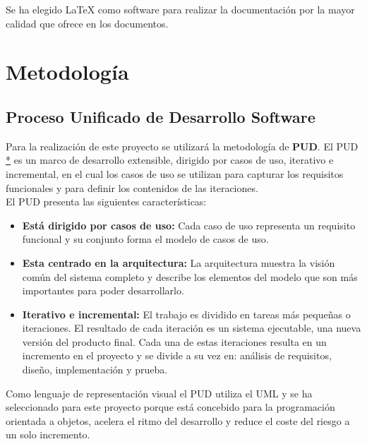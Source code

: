 \documentclass[12pt, a4paper]{book}
\begin{document}
Se ha elegido LaTeX como software para realizar la documentación por la mayor calidad que ofrece en los documentos. \\

\newpage



\chapter{Metodología}

\section{Proceso Unificado de Desarrollo Software}
Para la realización de este proyecto se utilizará la metodología de \textbf{ \gls{PUD}}. El \gls{PUD} \href{https://es.wikipedia.org/wiki/Proceso_unificado}{*} es un marco de desarrollo extensible, dirigido por casos de uso, iterativo e incremental, en el cual los casos de uso se utilizan para capturar los requisitos funcionales y para definir los contenidos de las iteraciones.\\

El \gls{PUD} presenta las siguientes características:

\begin{itemize}
	\item \textbf{Está dirigido por casos de uso:} Cada caso de uso representa un requisito funcional y su conjunto forma el modelo de casos de uso.
	\item \textbf{Esta centrado en la arquitectura:} La arquitectura muestra la visión común del sistema completo y describe los elementos del modelo que son más importantes para poder desarrollarlo.
	\item \textbf{Iterativo e incremental: } El trabajo es dividido en tareas más pequeñas o iteraciones. El resultado de cada iteración es un sistema ejecutable, una nueva versión del producto final. Cada una de estas iteraciones resulta en un incremento en el proyecto y se divide a su vez en: análisis de requisitos, diseño, implementación y prueba.
\end{itemize}

Como lenguaje de representación visual el \gls{PUD} utiliza el \gls{UML} y se ha seleccionado para este proyecto porque está concebido para la programación orientada a objetos, acelera el ritmo del desarrollo y reduce el coste del riesgo a un solo incremento.   

\newpage 
\end{document}
